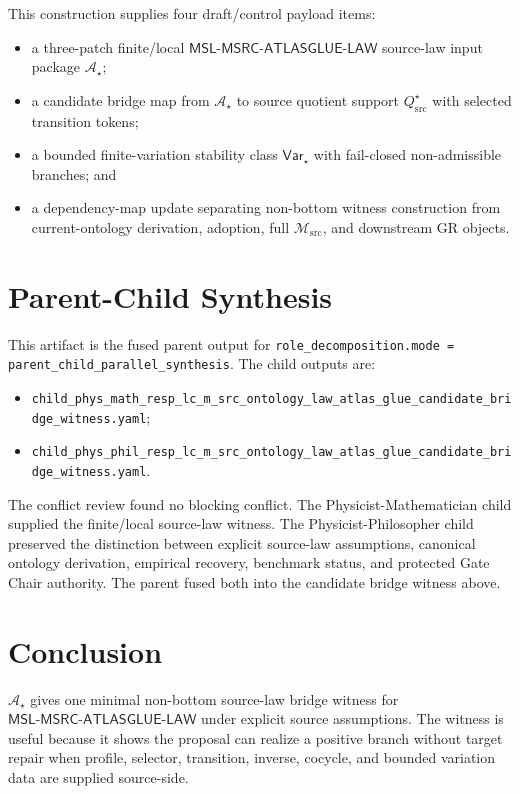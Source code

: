 \documentclass[11pt]{article}
\newcommand{\Msrc}{\mathcal{M}_{\mathrm{src}}}
\newcommand{\MSL}{\mathsf{MSL}\mbox{-}\mathsf{MSRC}\mbox{-}\mathsf{ATLASGLUE}\mbox{-}\mathsf{LAW}}
\newcommand{\Qstar}{Q_{\mathrm{src}}^{\star}}
\newcommand{\Astar}{\mathcal A_{\star}}
\newcommand{\Varstar}{\mathsf{Var}_{\star}}
\begin{document}
This construction supplies four draft/control payload items:
\begin{itemize}
  \item a three-patch finite/local \(\MSL\) source-law input package
  \(\Astar\);
  \item a candidate bridge map from \(\Astar\) to source quotient support
  \(\Qstar\) with selected transition tokens;
  \item a bounded finite-variation stability class \(\Varstar\) with
  fail-closed non-admissible branches; and
  \item a dependency-map update separating non-bottom witness construction
  from current-ontology derivation, adoption, full \(\Msrc\), and downstream
  GR objects.
\end{itemize}

\section{Parent-Child Synthesis}

This artifact is the fused parent output for
\texttt{role\_decomposition.mode = parent\_child\_parallel\_synthesis}. The
child outputs are:
\begin{itemize}
  \item \texttt{child\_phys\_math\_resp\_lc\_m\_src\_ontology\_law\_atlas\_glue\_candidate\_bridge\_witness.yaml};
  \item \texttt{child\_phys\_phil\_resp\_lc\_m\_src\_ontology\_law\_atlas\_glue\_candidate\_bridge\_witness.yaml}.
\end{itemize}
The conflict review found no blocking conflict. The Physicist-Mathematician
child supplied the finite/local source-law witness. The
Physicist-Philosopher child preserved the distinction between explicit
source-law assumptions, canonical ontology derivation, empirical recovery,
benchmark status, and protected Gate Chair authority. The parent fused both
into the candidate bridge witness above.

\section{Conclusion}

\(\Astar\) gives one minimal non-bottom source-law bridge witness for
\(\MSL\) under explicit source assumptions. The witness is useful because it
shows the proposal can realize a positive branch without target repair when
profile, selector, transition, inverse, cocycle, and bounded variation data
are supplied source-side.
\end{document}
